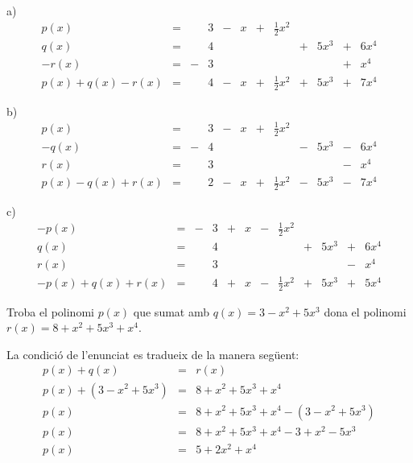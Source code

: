 \begin{solucio}
a)\[
\begin{array}{rccccccccccc}
p(x) & = & & 3 & - & x & + & \frac{1}{2}x^{2} & & & & \\
q(x) & = & & 4 & & & & & + & 5x^{3} & + & 6x^{4} \\
-r(x) & = & - & 3 & & & & & & & + & x^{4} \\ \hline
p(x)+q(x)-r(x) & = & & 4 & - & x & + & \frac{1}{2}x^{2} & + & 5x^{3} & + &
7x^{4}\end{array}\]

b)\[
\begin{array}{rccccccccccc}
p(x) & = & & 3 & - & x & + & \frac{1}{2}x^{2} & & & & \\
-q(x) & = & - & 4 & & & & & - & 5x^{3} & - & 6x^{4} \\
r(x) & = & & 3 & & & & & & & - & x^{4} \\ \hline
p(x)-q(x)+r(x) & = & & 2 & - & x & + & \frac{1}{2}x^{2} & - & 5x^{3} & - &
7x^{4}\end{array}\]

c)\[
\begin{array}{rccccccccccc}
-p(x) & = & - & 3 & + & x & - & \frac{1}{2}x^{2} & & & & \\
q(x) & = & & 4 & & & & & + & 5x^{3} & + & 6x^{4} \\
r(x) & = & & 3 & & & & & & & - & x^{4} \\ \hline
-p(x)+q(x)+r(x) & = & & 4 & + & x & - & \frac{1}{2}x^{2} & + & 5x^{3} & + &
5x^{4}\end{array}\]
\end{solucio}

\begin{exercici}
Troba el polinomi $p(x)$ que sumat amb $q(x)=3-x^{2}+5x^{3}$ dona el
polinomi $r(x)=8+x^{2}+5x^{3}+x^{4}$.
\end{exercici}

\begin{solucio}
La condició de l'enunciat es tradueix de la manera següent:\begin{eqnarray*}
p(x)+q(x) &=&r(x) \\
p(x)+\left( 3-x^{2}+5x^{3}\right) &=&8+x^{2}+5x^{3}+x^{4} \\
p(x) &=&8+x^{2}+5x^{3}+x^{4}-\left( 3-x^{2}+5x^{3}\right) \\
p(x) &=&8+x^{2}+5x^{3}+x^{4}-3+x^{2}-5x^{3} \\
p(x) &=&5+2x^{2}+x^{4}
\end{eqnarray*}
\end{solucio}

